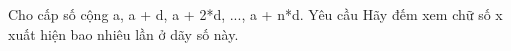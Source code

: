 Cho cấp số cộng a, a + d, a + 2*d, ..., a + n*d.
   Yêu cầu  
Hãy đếm xem chữ số x xuất hiện bao nhiêu lần ở dãy số này.